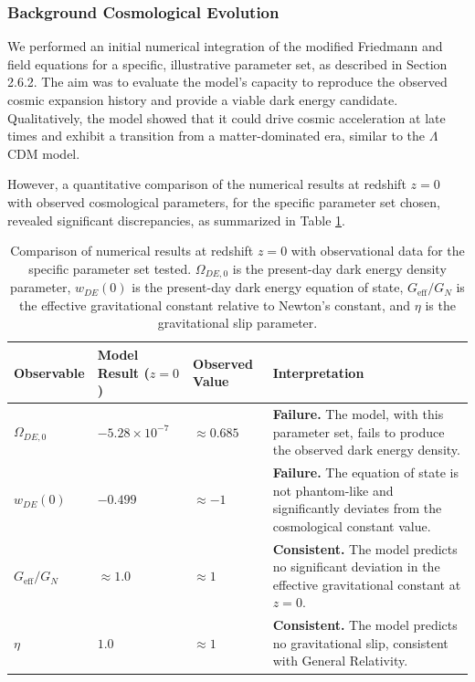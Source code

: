 \documentclass[twocolumn]{aastex631}
\begin{document}
\subsubsection{Background Cosmological Evolution}
We performed an initial numerical integration of the modified Friedmann and field equations for a specific, illustrative parameter set, as described in Section 2.6.2. The aim was to evaluate the model's capacity to reproduce the observed cosmic expansion history and provide a viable dark energy candidate. Qualitatively, the model showed that it could drive cosmic acceleration at late times and exhibit a transition from a matter-dominated era, similar to the $\Lambda$CDM model.

However, a quantitative comparison of the numerical results at redshift $z=0$ with observed cosmological parameters, for the specific parameter set chosen, revealed significant discrepancies, as summarized in Table \ref{tab:cosmo_results}.

\begin{table}[ht!]
\caption{Comparison of numerical results at redshift $z=0$ with observational data for the specific parameter set tested. $\Omega_{DE,0}$ is the present-day dark energy density parameter, $w_{DE}(0)$ is the present-day dark energy equation of state, $G_{\text{eff}}/G_N$ is the effective gravitational constant relative to Newton's constant, and $\eta$ is the gravitational slip parameter.}
\label{tab:cosmo_results}
\centering
\begin{tabular}{p{} p{} p{} p{}}
\hline
\textbf{Observable} & \textbf{Model Result ($z=0$)} & \textbf{Observed Value} & \textbf{Interpretation} \\
\hline
$\Omega_{DE,0}$ & $-5.28 \times 10^{-7}$ & $\approx 0.685$ & \textbf{Failure.} The model, with this parameter set, fails to produce the observed dark energy density. \\
$w_{DE}(0)$ & $-0.499$ & $\approx -1$ & \textbf{Failure.} The equation of state is not phantom-like and significantly deviates from the cosmological constant value. \\
$G_{\text{eff}}/G_N$ & $\approx 1.0$ & $\approx 1$ & \textbf{Consistent.} The model predicts no significant deviation in the effective gravitational constant at $z=0$. \\
$\eta$ & $1.0$ & $\approx 1$ & \textbf{Consistent.} The model predicts no gravitational slip, consistent with General Relativity. \\
\hline
\end{tabular}
\end{table}
\end{document}
